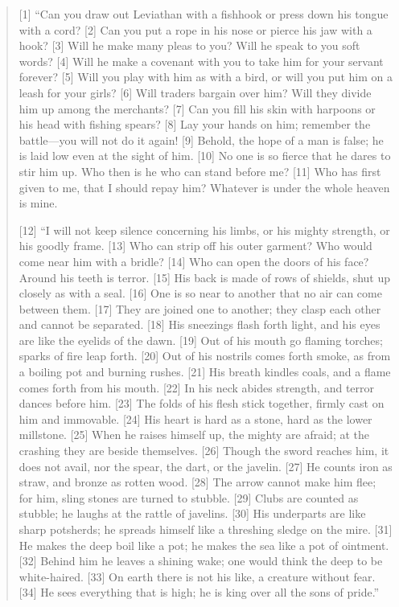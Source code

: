 \begin{quote}
    [1] “Can you draw out Leviathan with a fishhook
        or press down his tongue with a cord?
    [2] Can you put a rope in his nose
        or pierce his jaw with a hook?
    [3] Will he make many pleas to you?
        Will he speak to you soft words?
    [4] Will he make a covenant with you
        to take him for your servant forever?
    [5] Will you play with him as with a bird,
        or will you put him on a leash for your girls?
    [6] Will traders bargain over him?
        Will they divide him up among the merchants?
    [7] Can you fill his skin with harpoons
        or his head with fishing spears?
    [8] Lay your hands on him;
        remember the battle—you will not do it again!
    [9] Behold, the hope of a man is false;
        he is laid low even at the sight of him.
    [10] No one is so fierce that he dares to stir him up.
        Who then is he who can stand before me?
    [11] Who has first given to me, that I should repay him?
        Whatever is under the whole heaven is mine.


    [12] “I will not keep silence concerning his limbs,
        or his mighty strength, or his goodly frame.
    [13] Who can strip off his outer garment?
        Who would come near him with a bridle?
    [14] Who can open the doors of his face?
        Around his teeth is terror.
    [15] His back is made of rows of shields,
        shut up closely as with a seal.
    [16] One is so near to another
        that no air can come between them.
    [17] They are joined one to another;
        they clasp each other and cannot be separated.
    [18] His sneezings flash forth light,
        and his eyes are like the eyelids of the dawn.
    [19] Out of his mouth go flaming torches;
        sparks of fire leap forth.
    [20] Out of his nostrils comes forth smoke,
        as from a boiling pot and burning rushes.
    [21] His breath kindles coals,
        and a flame comes forth from his mouth.
    [22] In his neck abides strength,
        and terror dances before him.
    [23] The folds of his flesh stick together,
        firmly cast on him and immovable.
    [24] His heart is hard as a stone,
        hard as the lower millstone.
    [25] When he raises himself up, the mighty are afraid;
        at the crashing they are beside themselves.
    [26] Though the sword reaches him, it does not avail,
        nor the spear, the dart, or the javelin.
    [27] He counts iron as straw,
        and bronze as rotten wood.
    [28] The arrow cannot make him flee;
        for him, sling stones are turned to stubble.
    [29] Clubs are counted as stubble;
        he laughs at the rattle of javelins.
    [30] His underparts are like sharp potsherds;
        he spreads himself like a threshing sledge on the mire.
    [31] He makes the deep boil like a pot;
        he makes the sea like a pot of ointment.
    [32] Behind him he leaves a shining wake;
        one would think the deep to be white-haired.
    [33] On earth there is not his like,
        a creature without fear.
    [34] He sees everything that is high;
        he is king over all the sons of pride.”


\end{quote}
